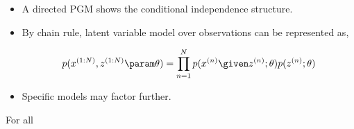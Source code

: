 \begin{frame}
    
    \begin{itemize}
        \item A directed PGM shows the conditional independence structure. 
        \item  By chain rule, latent variable model over observations can be represented as, 
        \begin{figure}
        \centering
                \[ p(x^{(1:N)}, z^{(1:N)} \param \theta) = \prod_{n=1}^N p(x^{(n)} \given z^{(n)}; \theta) p(z^{(n)};\theta) \]
 
         \end{figure}
                 \item Specific models may factor further.

    \end{itemize}
        

\end{frame}

\begin{frame}
    For all 
\end{frame}

